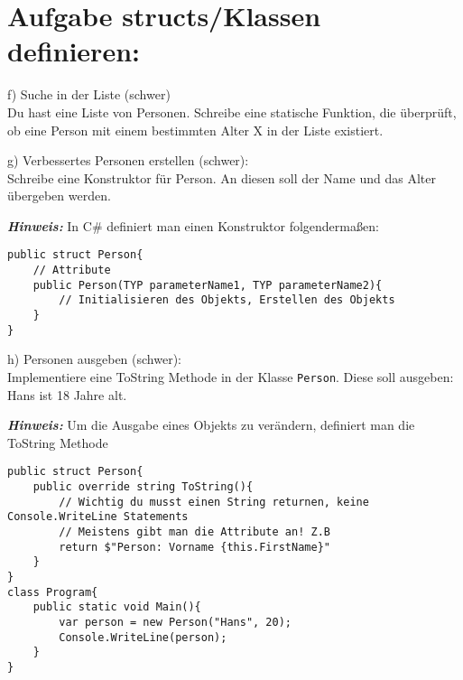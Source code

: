 \documentclass[12pt]{article}
\newenvironment{aufgabe}[2]
  {%
   \section*{Aufgabe #1: #2}
   \vspace{0.5em}
   \begin{adjustwidth}{1cm}{}  %
  }
  {%
   \end{adjustwidth}
  }
\newcommand{\subaufgabe}[1]{
    #1
}
\newcommand{\hint}[1]{
    \vspace{0.5em}
    \textbf{\textit{Hinweis:}} #1
    \vspace{0.5em}
}
\begin{document}
\begin{aufgabe}{2}{structs/Klassen definieren}
\subaufgabe{f) Suche in der Liste (schwer)\\
Du hast eine Liste von Personen. Schreibe eine statische Funktion, die überprüft, ob eine Person mit einem bestimmten Alter X in der Liste existiert.}

\subaufgabe{g) Verbessertes Personen erstellen (schwer): \\
Schreibe eine Konstruktor für Person. An diesen soll der Name und das Alter übergeben werden.
}

\hint{In C\# definiert man einen Konstruktor folgendermaßen:}
\begin{lstlisting}
public struct Person{
    // Attribute
    public Person(TYP parameterName1, TYP parameterName2){
        // Initialisieren des Objekts, Erstellen des Objekts
    }
}
\end{lstlisting}

\subaufgabe{h) Personen ausgeben (schwer): \\
Implementiere eine ToString Methode in der Klasse \texttt{Person}. Diese soll ausgeben: Hans ist 18 Jahre alt.
}

\hint{Um die Ausgabe eines Objekts zu verändern, definiert man die ToString Methode}
\begin{lstlisting}
public struct Person{
    public override string ToString(){
        // Wichtig du musst einen String returnen, keine Console.WriteLine Statements
        // Meistens gibt man die Attribute an! Z.B
        return $"Person: Vorname {this.FirstName}"
    }
}
class Program{
    public static void Main(){
        var person = new Person("Hans", 20);
        Console.WriteLine(person);
    }
}
\end{lstlisting}

\end{aufgabe}
\end{document}
